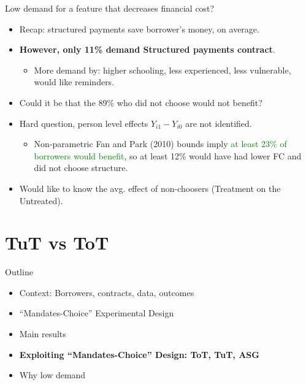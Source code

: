 \documentclass[9pt, aspectratio=169]{beamer}
\begin{document}
\begin{frame}{Low demand for a feature that decreases financial cost?}
    \begin{itemize}
        \item Recap: structured payments save borrower's money, on average.
        \vfill \item  \textbf{However, only 11\% demand Structured payments contract}.
        \begin{itemize}
            \item More demand by: higher schooling, less experienced, less vulnerable, would like reminders.
        \end{itemize}
        \vfill\item Could it be that the 89\% \alert{who did not choose} would not benefit?
        \vfill\item Hard question, person level effects  $Y_{i1} - Y_{i0}$ are not identified.
        \begin{itemize}
            \item Non-parametric Fan and Park (2010) bounds imply \textcolor{green}{at least 23\% of borrowers would benefit}, so at least 12\% would have had lower FC and did not choose structure. 
        \end{itemize}
        \vfill\item Would like to know the avg. effect of non-choosers (\alert{Treatment on the Untreated}). 
    \end{itemize}
\end{frame}




\section{TuT vs ToT}

\begin{frame}{Outline}
     \large   
     \begin{itemize}
        \item Context: Borrowers, contracts, data, outcomes
         \item \vfill ``Mandates-Choice'' Experimental Design
         \vfill\item Main results
          \vfill\item \textbf{Exploiting ``Mandates-Choice'' Design: ToT, TuT, ASG}
         \vfill\item Why low demand
         
     \end{itemize}
\end{frame}
\end{document}
